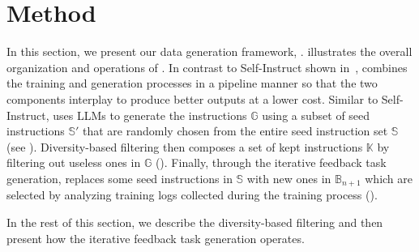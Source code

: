 \section{Method}
\label{sec:method}

In this section, we present our data generation framework,
\ours{}.
 illustrates 
the overall organization and operations of \ours{}.
In contrast to Self-Instruct shown in~,
\ours{} combines the training and generation processes in a pipeline manner
so that the two components interplay to produce better outputs at a lower cost.
Similar to Self-Instruct, \ours{} uses LLMs to generate the 
instructions $\mathbb{G}$ 
using a subset of seed instructions $\mathbb{S}'$ 
that are randomly chosen 
from the entire seed instruction set $\mathbb{S}$
(see ). 
Diversity-based filtering then composes
a set of kept instructions $\mathbb{K}$
by filtering out useless ones in $\mathbb{G}$ (). 
Finally, through the iterative feedback task generation,
\ours{} replaces some seed instructions in $\mathbb{S}$
with new ones in $\mathbb{B}_{n+1}$ which are selected by analyzing 
training logs collected during the training process ().

In the rest of this section, we describe the diversity-based filtering 
and then present how the iterative feedback task generation operates.

\begin{comment}
\begin{table}[]
\caption{Terminology}
\label{tab:my-table}
\footnotesize
\begin{tabular}{c|l}
Mark & Description \\ \hline
$\mathbb{S}$ & The set of seed instructions \\
$\mathbb{G}$ & The set of instructions generated in a single generation cycle \\
$\mathbb{K}$ & The set of instructions kept in a single generation cycle \\
$\mathbb{D}$ & The set of all instructions kept so far \\
$\mathbb{C}$ & The set of clusters
\end{tabular}
\end{table}
\end{comment}

